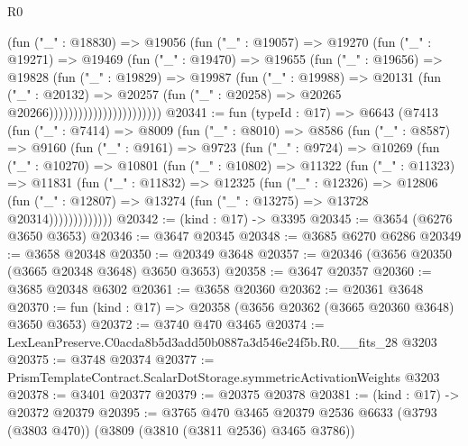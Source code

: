 \begin{lexlean}{R0}
\begin{coremodule}
                                (fun ("_" : @18830) =>
                                @19056
                                  (fun ("_" : @19057) =>
                                  @19270
                                    (fun ("_" : @19271) =>
                                    @19469
                                      (fun ("_" : @19470) =>
                                      @19655
                                        (fun ("_" : @19656) =>
                                        @19828
                                          (fun ("_" : @19829) =>
                                          @19987
                                            (fun ("_" : @19988) =>
                                            @20131
                                              (fun ("_" : @20132) =>
                                              @20257
                                                (fun ("_" : @20258) =>
                                                @20265 @20266)))))))))))))))))))))))
@20341 := fun (typeId : @17) =>
  @6643
    (@7413
      (fun ("_" : @7414) =>
      @8009
        (fun ("_" : @8010) =>
        @8586
          (fun ("_" : @8587) =>
          @9160
            (fun ("_" : @9161) =>
            @9723
              (fun ("_" : @9724) =>
              @10269
                (fun ("_" : @10270) =>
                @10801
                  (fun ("_" : @10802) =>
                  @11322
                    (fun ("_" : @11323) =>
                    @11831
                      (fun ("_" : @11832) =>
                      @12325
                        (fun ("_" : @12326) =>
                        @12806
                          (fun ("_" : @12807) =>
                          @13274 (fun ("_" : @13275) => @13728 @20314)))))))))))))
@20342 := (kind : @17) -> @3395
@20345 := @3654 (@6276 @3650 @3653)
@20346 := @3647 @20345
@20348 := @3685 @6270 @6286
@20349 := @3658 @20348
@20350 := @20349 @3648
@20357 := @20346 (@3656 @20350 (@3665 @20348 @3648) @3650 @3653)
@20358 := @3647 @20357
@20360 := @3685 @20348 @6302
@20361 := @3658 @20360
@20362 := @20361 @3648
@20370 := fun (kind : @17) => @20358 (@3656 @20362 (@3665 @20360 @3648) @3650 @3653)
@20372 := @3740 @470 @3465
@20374 := LexLeanPreserve.C0acda8b5d3add50b0887a3d546e24f5b.R0.__fits_28 @3203
@20375 := @3748 @20374
@20377 := PrismTemplateContract.ScalarDotStorage.symmetricActivationWeights @3203
@20378 := @3401 @20377
@20379 := @20375 @20378
@20381 := (kind : @17) -> @20372 @20379
@20395 := @3765
    @470
    @3465
    @20379
    @2536
    @6633
    (@3793 (@3803 @470))
    (@3809 (@3810 (@3811 @2536) @3465 @3786))

\end{coremodule}
\end{lexlean}
